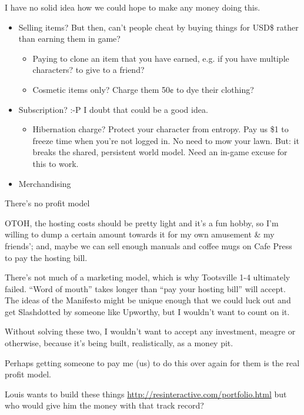 \documentclass[11pt]{article}
\begin{document}
I have no solid idea how we could hope to make any money doing this.

\begin{itemize}
\item Selling items? But then, can't people cheat by buying things for
USD\$ rather than earning them in game?

\begin{itemize}
\item Paying to clone an item that you have earned, e.g. if you have
multiple characters? to give to a friend?

\item Cosmetic items only?  Charge them 50¢ to dye their clothing?
\end{itemize}

\item Subscription? :-P I doubt that could be a good idea.

\begin{itemize}
\item Hibernation charge?  Protect your  character from entropy. Pay us
\$1 to freeze time when you're not logged in.  No need to mow your
lawn. But: it breaks the  shared, persistent world model. Need an
in-game excuse for this to work.
\end{itemize}

\item Merchandising
\end{itemize}

There's no profit model

OTOH, the hosting  costs should be pretty light and  it's a fun hobby,
so  I'm  willing to  dump  a  certain amount  towards  it  for my  own
amusement \&  my friends'; and,  maybe we  can sell enough  manuals and
coffee mugs on Cafe Press to pay the hosting bill.

There's not  much of a  marketing model,  which is why  Tootsville 1-4
ultimately failed. “Word of mouth” takes longer than “pay your hosting
bill” will accept.  The ideas of the Manifesto might  be unique enough
that we could  luck out and get Slashdotted by  someone like Upworthy,
but I wouldn't want to count on it.

Without solving these  two, I wouldn't want to  accept any investment,
meagre or  otherwise, because  it's being  built, realistically,  as a
money pit.

Perhaps getting someone to pay me (us)  to do this over again for them
is the real profit model.

Louis        wants         to        build         these        things
\url{http://resinteractive.com/portfolio.html}  but who  would give  him the
money with that track record?
\end{document}
